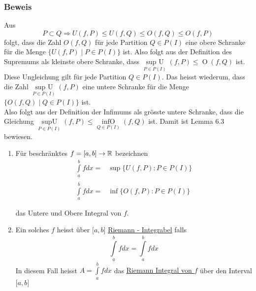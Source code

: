 \subsubsection*{Beweis}
Aus \[P\subset Q \Rightarrow U(f,P) \leq U(f,Q) \leq O(f,Q) \leq O(f,P)\] folgt, dass die Zahl $O(f,Q)$ für jede Partition $Q\in P(I)$ eine obere Schranke für die Menge $\{ U(f,P)\mid P\in P(I)\}$ ist. Also folgt aus der Definition des Supremums als kleinste obere Schranke, dass $\mathop {\sup {\text{ }}U}\limits_{P \in P(I)} (f,P) \le \mathop O(f,Q)$ ist. \\
\newpage
Diese Ungleichung gilt für jede Partition $Q\in P(I)$. Das heisst wiederum, dass die Zahl $\mathop {\sup {\text{ }}U}\limits_{P \in P(I)} (f,P)$ eine untere Schranke für die Menge $\{ O(f,Q)\mid Q \in P(I)\} $ ist.\\

Also folgt aus der Definition der Infimums als grösste untere Schranke, dass die Gleichung $\mathop {\sup U}\limits_{P \in P(I)} (f,P) \le \mathop {\inf O}\limits_{Q \in P(I)} (f,Q)$ ist. Damit ist Lemma 6.3 bewiesen.
\begin{definition}{6.4}
\begin{enumerate}[\indent 1)]

\item Für beschränktes $f=\lbrack a,b \rbrack\rightarrow \mathbb{R}$ bezeichnen 
\begin{align*}
\int\limits_{\underline{a}}^b fdx =&\sup \{ U(f,P):P \in P(I)\}\\ 
\int\limits_{a}^{\overline{b}} fdx =&\inf \{ O(f,P):P \in P(I)\} 
\end{align*}

das Untere und Obere Integral von $f$.
\item Ein solches $f$ heisst über $\lbrack a,b\rbrack$ \underline{Riemann - Integrabel} falls \[\int\limits_{\underline{a}}^b {fdx}  = \int\limits_a^{\overline{b}} {fdx} \] In diesem Fall heisst $A = \int\limits_a^b {fdx} $ das \underline{Riemann Integral von $f$} über den Interval $\lbrack a,b\rbrack$
\end{enumerate}
\end{definition}

